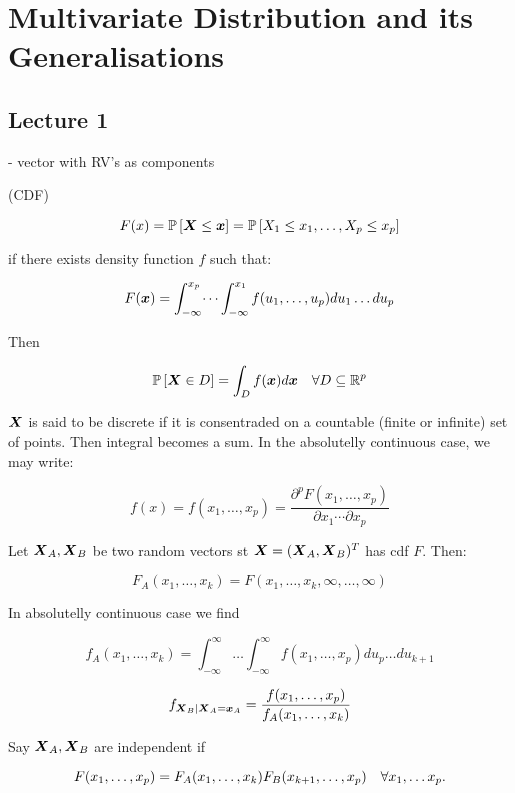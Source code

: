\section{Multivariate Distribution and its Generalisations}
\subsection*{Lecture 1}

 - vector with RV's as components


 (CDF)

$$
    F(x)=\mathbb{P}\left[\boldsymbol{X}\leq \boldsymbol{x}\right] = \mathbb{P}\left[X_1\leq x_1,\dots,X_p\leq x_p\right]
$$

 if there exists density function $f$ such that:

$$
    F(\boldsymbol{x})=\int_{-\infty}^{x_p}\dots\int_{-\infty}^{x_1} f(u_1,\dots,u_p) du_1\dots du_p
$$

Then 

$$
    \mathbb{P}\left[\boldsymbol{X}\in D\right] = \int_D f(\boldsymbol{x}) d\boldsymbol{x} \quad\forall D\subseteq \mathbb{R}^p
$$

$\boldsymbol{X}$ is said to be discrete if it is consentraded on a countable (finite or infinite) set of points. Then integral becomes a sum. In the absolutelly continuous case, we may write:

$$
    f(x)=f\left(x_1, \ldots, x_p\right)=\frac{\partial^p F\left(x_1, \ldots, x_p\right)}{\partial x_1 \cdots \partial x_p}
$$

\textbf{} 

Let $\boldsymbol{X}_A, \boldsymbol{X}_B$ be two random vectors st $\boldsymbol{X}=(\boldsymbol{X}_A,\boldsymbol{X}_B)^T$ has cdf $F$. Then:

$$
    F_A(x_1,\dots,x_k) = F(x_1,\dots,x_k,\infty,\dots,\infty)
$$

In absolutelly continuous case we find

$$
    f_A(x_1,\dots,x_k) = \int_{-\infty}^{\infty}\dots\int_{-\infty}^{\infty} f(x_1,\dots,x_p) du_p\dots du_{k+1}
$$

\textbf{} 

$$
    f_{\boldsymbol{X}_B|\boldsymbol{X}_A=\boldsymbol{x}_A} = \frac{f(x_1,\dots,x_p)}{f_A(x_1,\dots,x_k)}
$$

\textbf{} 

Say $\boldsymbol{X}_A, \boldsymbol{X}_B$ are independent if 

$$
    F(x_1,\dots,x_p)=F_A(x_1,\dots,x_k)F_B(x_{k+1},\dots,x_p) \quad\forall x_1,\dots x_p.
$$

